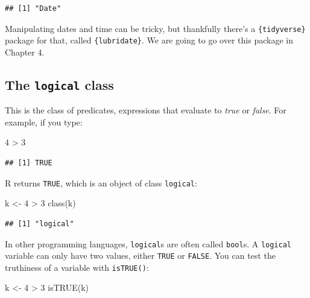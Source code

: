 \documentclass[
]{article}
\newenvironment{Shaded}{\begin{snugshade}}{\end{snugshade}}
\newcommand{\DecValTok}[1]{\textcolor[rgb]{0.00,0.00,0.81}{#1}}
\newcommand{\FunctionTok}[1]{\textcolor[rgb]{0.00,0.00,0.00}{#1}}
\newcommand{\NormalTok}[1]{#1}
\newcommand{\OtherTok}[1]{\textcolor[rgb]{0.56,0.35,0.01}{#1}}
\newcommand{\SpecialCharTok}[1]{\textcolor[rgb]{0.00,0.00,0.00}{#1}}
\begin{document}
\begin{verbatim}
## [1] "Date"
\end{verbatim}

Manipulating dates and time can be tricky, but thankfully there's a \texttt{\{tidyverse\}} package for that,
called \texttt{\{lubridate\}}. We are going to go over this package in Chapter 4.

\hypertarget{the-logical-class}{%
\subsection{\texorpdfstring{The \texttt{logical} class}{The logical class}}\label{the-logical-class}}

This is the class of predicates, expressions that evaluate to \emph{true} or \emph{false}. For example, if you type:

\begin{Shaded}
\begin{Highlighting}[]
\DecValTok{4} \SpecialCharTok{\textgreater{}} \DecValTok{3}
\end{Highlighting}
\end{Shaded}

\begin{verbatim}
## [1] TRUE
\end{verbatim}

R returns \texttt{TRUE}, which is an object of class \texttt{logical}:

\begin{Shaded}
\begin{Highlighting}[]
\NormalTok{k }\OtherTok{\textless{}{-}} \DecValTok{4} \SpecialCharTok{\textgreater{}} \DecValTok{3}
\FunctionTok{class}\NormalTok{(k)}
\end{Highlighting}
\end{Shaded}

\begin{verbatim}
## [1] "logical"
\end{verbatim}

In other programming languages, \texttt{logical}s are often called \texttt{bool}s. A \texttt{logical} variable can only have
two values, either \texttt{TRUE} or \texttt{FALSE}. You can test the truthiness of a variable with \texttt{isTRUE()}:

\begin{Shaded}
\begin{Highlighting}[]
\NormalTok{k }\OtherTok{\textless{}{-}} \DecValTok{4} \SpecialCharTok{\textgreater{}} \DecValTok{3}
\FunctionTok{isTRUE}\NormalTok{(k)}
\end{Highlighting}
\end{Shaded}
\end{document}
